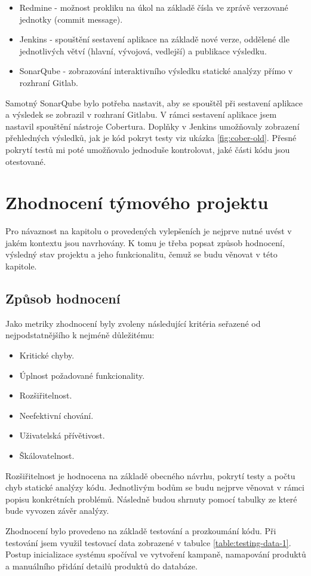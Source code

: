 \documentclass[thesis=B,czech]{FITthesis}[2012/06/26]
\begin{document}
\begin{itemize}
\item Redmine - možnost prokliku na úkol na základě čísla ve zprávě verzované jednotky (commit message).
\item Jenkins - spouštění sestavení aplikace na základě nové verze, oddělené dle jednotlivých větví (hlavní, vývojová, vedlejší) a
				publikace výsledku.
\item SonarQube - zobrazování interaktivního výsledku statické analýzy přímo v rozhraní Gitlab.
\end{itemize}

Samotný SonarQube bylo potřeba nastavit, aby se spouštěl při sestavení aplikace a výsledek se zobrazil v rozhraní
Gitlabu. V rámci sestavení aplikace jsem nastavil spouštění nástroje Cobertura.
Doplňky v Jenkins umožňovaly zobrazení přehledných výsledků, jak je kód pokryt testy viz ukázka \ref{fig:cober-old}. Přesné pokrytí testů mi poté umožňovalo 
jednoduše kontrolovat, jaké části kódu jsou otestované.


\chapter{Zhodnocení týmového projektu}
Pro návaznost na kapitolu o provedených vylepšeních je nejprve nutné uvést v jakém kontextu jsou navrhovány. K tomu je třeba
popsat způsob hodnocení, výsledný stav projektu a jeho funkcionalitu, čemuž se budu věnovat v této kapitole.

\section{Způsob hodnocení}\label{sec:zhodnoceni-typ}
Jako metriky zhodnocení byly zvoleny následující kritéria seřazené od nejpodstatnějšího k nejméně důležitému: 

\begin{itemize}
\item Kritické chyby.
\item Úplnost požadované funkcionality.
\item Rozšiřitelnost.
\item Neefektivní chování.
\item Uživatelská přívětivost.
\item Škálovatelnost.
\end{itemize}

Rozšiřitelnost je hodnocena na základě obecného návrhu, pokrytí testy a počtu chyb statické analýzy kódu. 
Jednotlivým bodům se budu nejprve věnovat v rámci popisu konkrétních problémů. Následně budou shrnuty pomocí tabulky ze které
bude vyvozen závěr analýzy.
\par
Zhodnocení bylo provedeno na základě testování a prozkoumání kódu.
Při testování jsem využil testovací data zobrazené v tabulce \ref{table:testing-data-1}. Postup inicializace systému spočíval ve vytvoření kampaně, namapování produktů a manuálního přidání detailů produktů do databáze.
\end{document}
